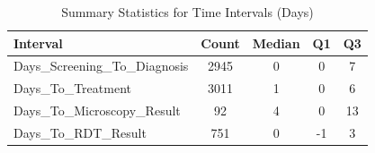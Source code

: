 \begin{table}[htbp]

\caption{Summary Statistics for Time Intervals (Days)}
\label{tab:time_interval_summary}
\centering
\begin{tabular}{lcccc}

\toprule

Interval & Count & Median & Q1 & Q3 \\

\midrule

Days\_Screening\_To\_Diagnosis & 2945 & 0 & 0 & 7 \\
Days\_To\_Treatment & 3011 & 1 & 0 & 6 \\
Days\_To\_Microscopy\_Result & 92 & 4 & 0 & 13 \\
Days\_To\_RDT\_Result & 751 & 0 & -1 & 3 \\

\bottomrule

\end{tabular}

\end{table}